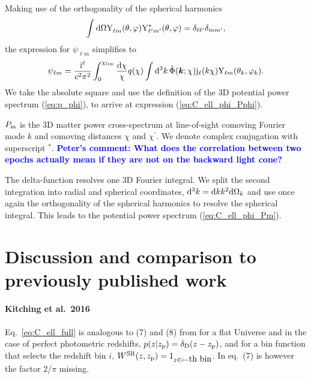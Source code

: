 \documentclass[useAMS,usenatbib]{mn2e} %
\renewcommand{\vec}{\bm}
\newcommand{\mk}[1]{{\bf\textcolor{blue}{#1}}}
\begin{document}
\begin{appendix}
Making use of the orthogonality of the spherical harmonics
%
%
\begin{equation}
  \int {\rm d} \Omega {\rm Y}^{}_{\ell m}(\theta, \varphi) {\rm Y}^\ast_{\ell^\prime m^\prime}(\theta, \varphi) = \delta_{\ell \ell^\prime} \delta_{m m^\prime},
  \label{eq:Yellm_ortho}
\end{equation}
%
the expression for $\psi_{\ell m}$ simplifies to
%
\begin{equation}
  \psi_{\ell m} = \frac {{\rm i}^\ell}{c^2 \pi^2} \int_0^{\chi_{\rm lim}} \frac{{\rm d}\chi}{\chi} q(\chi) \int {\rm d}^3 k \,
    \hat \Phi(\vec k; \chi) {\rm j}_\ell(k \chi) {\rm Y}_{\ell m}(\theta_k, \varphi_k).
  \label{eq:psi_ellm}
\end{equation}
%
We take the absolute square and use the definition of the 3D potential power spectrum (\ref{eq:p_phi}),
to arrive at expression (\ref{eq:C_ell_phi_Pphi}).

$P_{\rm m}$ is the 3D matter power cross-spectrum at line-of-sight comoving
Fourier mode $k$ and comoving distances $\chi$ and $\chi^\prime$. We denote
complex conjugation with superscript $^\ast$.
\mk{Peter's comment: What does the correlation between two epochs actually mean if they
are not on the backward light cone?}

The delta-function resolves one 3D Fourier
integral. We split the second integration into radial and spherical
coordinates, ${\rm d}^3 k = {\rm d} k k^2 {\rm d} \Omega_k$ and use once again
the orthogonality of the spherical harmonics to resolve the spherical integral. 
This leads to the potential power spectrum (\ref{eq:C_ell_phi_Pm}).




\section{Discussion and comparison to previously published work}

\paragraph{Kitching et al.~2016}

Eq.~\ref{eq:C_ell_full} is analogous to (7) and (8) from
\cite{2016arXiv161104954K} for a flat Universe and in the case of perfect
photometric redshifts, $p(z | z_{\rm p}) = \delta_{\rm D}(z - z_{\rm p})$, and
for a bin function that selects the redshift bin $i$, $W^{\rm SR}(z, z_{\rm p})
= 1_{z \in i-\mbox{th bin}}$. In \cite{2016arXiv161104954K} eq.~(7) is however the
factor $2/\pi$ missing.


\end{appendix}
\end{document}
